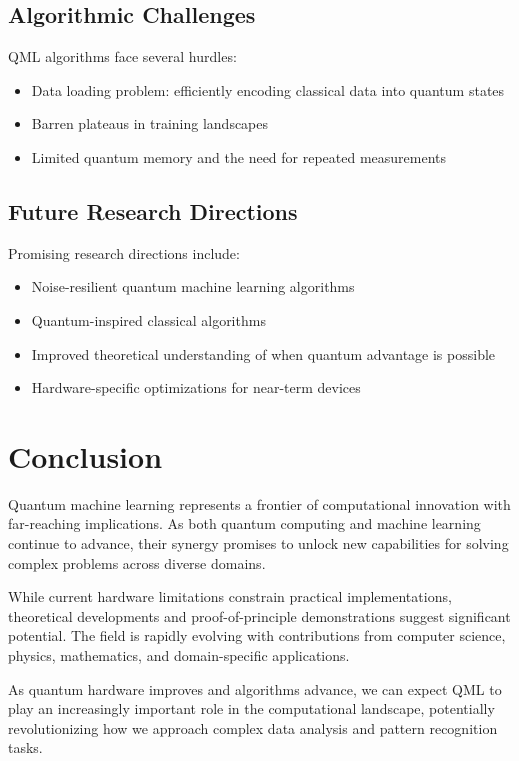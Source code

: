 \documentclass[12pt,a4paper]{article}
\begin{document}
\subsection{Algorithmic Challenges}

QML algorithms face several hurdles:

\begin{itemize}
    \item Data loading problem: efficiently encoding classical data into quantum states
    \item Barren plateaus in training landscapes
    \item Limited quantum memory and the need for repeated measurements
\end{itemize}

\subsection{Future Research Directions}

Promising research directions include:

\begin{itemize}
    \item Noise-resilient quantum machine learning algorithms
    \item Quantum-inspired classical algorithms
    \item Improved theoretical understanding of when quantum advantage is possible
    \item Hardware-specific optimizations for near-term devices
\end{itemize}

\section{Conclusion}

Quantum machine learning represents a frontier of computational innovation with far-reaching implications. As both quantum computing and machine learning continue to advance, their synergy promises to unlock new capabilities for solving complex problems across diverse domains.

While current hardware limitations constrain practical implementations, theoretical developments and proof-of-principle demonstrations suggest significant potential. The field is rapidly evolving with contributions from computer science, physics, mathematics, and domain-specific applications.

As quantum hardware improves and algorithms advance, we can expect QML to play an increasingly important role in the computational landscape, potentially revolutionizing how we approach complex data analysis and pattern recognition tasks.



\end{document}

